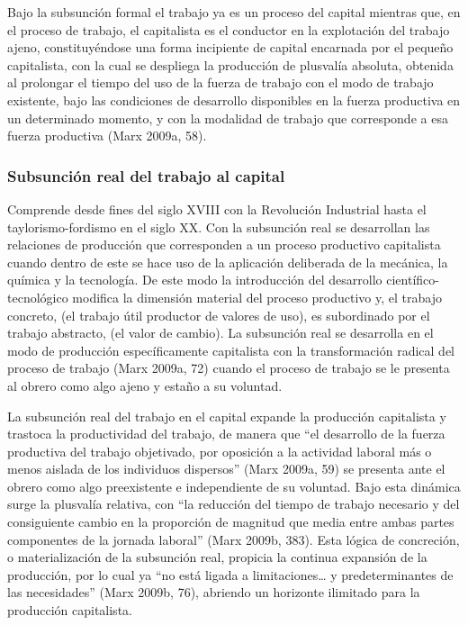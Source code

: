 \documentclass[
]{interact}
\begin{document}
Bajo la subsunción formal el trabajo ya es un proceso del capital
mientras que, en el proceso de trabajo, el capitalista es el conductor
en la explotación del trabajo ajeno, constituyéndose una forma
incipiente de capital encarnada por el pequeño capitalista, con la cual
se despliega la producción de plusvalía absoluta, obtenida al prolongar
el tiempo del uso de la fuerza de trabajo con el modo de trabajo
existente, bajo las condiciones de desarrollo disponibles en la fuerza
productiva en un determinado momento, y con la modalidad de trabajo que
corresponde a esa fuerza productiva (Marx 2009a, 58).

\subsubsection{Subsunción real del trabajo al
capital}\label{subsunciuxf3n-real-del-trabajo-al-capital}

Comprende desde fines del siglo XVIII con la Revolución Industrial hasta
el taylorismo-fordismo en el siglo XX. Con la subsunción real se
desarrollan las relaciones de producción que corresponden a un proceso
productivo capitalista cuando dentro de este se hace uso de la
aplicación deliberada de la mecánica, la química y la tecnología. De
este modo la introducción del desarrollo científico-tecnológico modifica
la dimensión material del proceso productivo y, el trabajo concreto, (el
trabajo útil productor de valores de uso), es subordinado por el trabajo
abstracto, (el valor de cambio). La subsunción real se desarrolla en el
modo de producción específicamente capitalista con la transformación
radical del proceso de trabajo (Marx 2009a, 72) cuando el proceso de
trabajo se le presenta al obrero como algo ajeno y estaño a su voluntad.

La subsunción real del trabajo en el capital expande la producción
capitalista y trastoca la productividad del trabajo, de manera que ``el
desarrollo de la fuerza productiva del trabajo objetivado, por oposición
a la actividad laboral más o menos aislada de los individuos dispersos''
(Marx 2009a, 59) se presenta ante el obrero como algo preexistente e
independiente de su voluntad. Bajo esta dinámica surge la plusvalía
relativa, con ``la reducción del tiempo de trabajo necesario y del
consiguiente cambio en la proporción de magnitud que media entre ambas
partes componentes de la jornada laboral'' (Marx 2009b, 383). Esta
lógica de concreción, o materialización de la subsunción real, propicia
la continua expansión de la producción, por lo cual ya ``no está ligada
a limitaciones\ldots{} y predeterminantes de las necesidades'' (Marx
2009b, 76), abriendo un horizonte ilimitado para la producción
capitalista.
\end{document}
